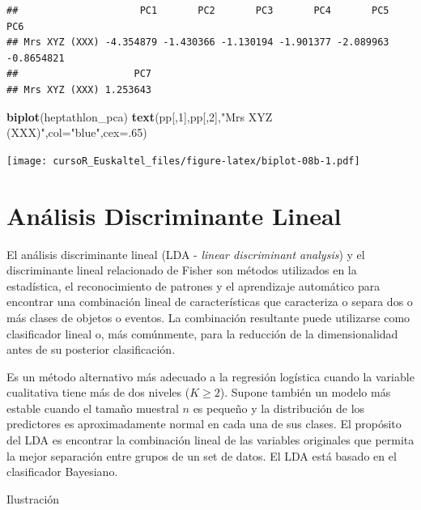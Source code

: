 \documentclass[]{book}
\newenvironment{Shaded}{\begin{snugshade}}{\end{snugshade}}
\newcommand{\KeywordTok}[1]{\textcolor[rgb]{0.13,0.29,0.53}{\textbf{#1}}}
\newcommand{\DataTypeTok}[1]{\textcolor[rgb]{0.13,0.29,0.53}{#1}}
\newcommand{\DecValTok}[1]{\textcolor[rgb]{0.00,0.00,0.81}{#1}}
\newcommand{\StringTok}[1]{\textcolor[rgb]{0.31,0.60,0.02}{#1}}
\newcommand{\NormalTok}[1]{#1}
\begin{document}
\begin{verbatim}
##                     PC1       PC2       PC3       PC4       PC5        PC6
## Mrs XYZ (XXX) -4.354879 -1.430366 -1.130194 -1.901377 -2.089963 -0.8654821
##                    PC7
## Mrs XYZ (XXX) 1.253643
\end{verbatim}

\begin{Shaded}
\begin{Highlighting}[]
\KeywordTok{biplot}\NormalTok{(heptathlon_pca)}
\KeywordTok{text}\NormalTok{(pp[,}\DecValTok{1}\NormalTok{],pp[,}\DecValTok{2}\NormalTok{],}\StringTok{"Mrs XYZ (XXX)"}\NormalTok{,}\DataTypeTok{col=}\StringTok{"blue"}\NormalTok{,}\DataTypeTok{cex=}\NormalTok{.}\DecValTok{65}\NormalTok{)}
\end{Highlighting}
\end{Shaded}

\texttt{[image: cursoR\_Euskaltel\_files/figure-latex/biplot-08b-1.pdf]}

\section{Análisis Discriminante
Lineal}\label{analisis-discriminante-lineal}

El análisis discriminante lineal (LDA - \emph{linear discriminant
analysis}) y el discriminante lineal relacionado de Fisher son métodos
utilizados en la estadística, el reconocimiento de patrones y el
aprendizaje automático para encontrar una combinación lineal de
características que caracteriza o separa dos o más clases de objetos o
eventos. La combinación resultante puede utilizarse como clasificador
lineal o, más comúnmente, para la reducción de la dimensionalidad antes
de su posterior clasificación.

Es un método alternativo más adecuado a la regresión logística cuando la
variable cualitativa tiene más de dos niveles (\(K \geq 2\)). Supone
también un modelo más estable cuando el tamaño muestral \(n\) es pequeño
y la distribución de los predictores es aproximadamente normal en cada
una de sus clases. El propósito del LDA es encontrar la combinación
lineal de las variables originales que permita la mejor separación entre
grupos de un set de datos. El LDA está basado en el clasificador
Bayesiano.

Ilustración
\end{document}
